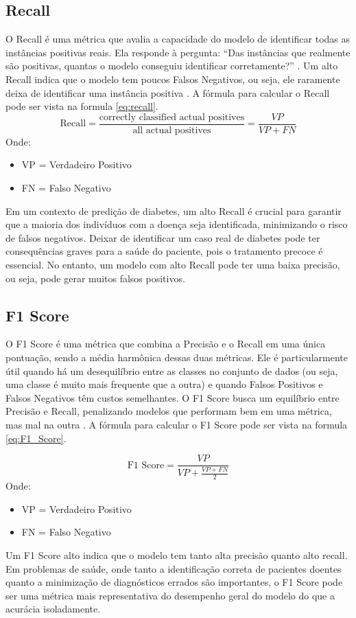 \subsection{Recall}
O Recall é uma métrica que avalia a capacidade do modelo de identificar todas as instâncias positivas reais. Ela responde à pergunta: “Das instâncias que realmente são positivas, quantas o modelo conseguiu identificar corretamente?” . Um alto Recall indica que o modelo tem poucos Falsos Negativos, ou seja, ele raramente deixa de identificar uma instância positiva \cite{Freitas2024}.
A fórmula para calcular o Recall pode ser vista na formula \ref{eq:recall}.
\begin{equation}
 \text{Recall} = \frac{\text{correctly classified actual positives}}{\text{all actual positives}} = \frac{VP}{VP+FN} 
    \label{eq:recall}
\end{equation}
Onde:
\begin{itemize}
    \item VP = Verdadeiro Positivo
    \item FN = Falso Negativo
\end{itemize}
Em um contexto de predição de diabetes, um alto Recall é crucial para garantir que a maioria dos indivíduos com a doença seja identificada, minimizando o risco de falsos negativos. Deixar de identificar um caso real de diabetes pode ter consequências graves para a saúde do paciente, pois o tratamento precoce é essencial. No entanto, um modelo com alto Recall pode ter uma baixa precisão, ou seja, pode gerar muitos falsos positivos.

\subsection{F1 Score}
O F1 Score é uma métrica que combina a Precisão e o Recall em uma única pontuação, sendo a média harmônica dessas duas métricas. Ele é particularmente útil quando há um desequilíbrio entre as classes no conjunto de dados (ou seja, uma classe é muito mais frequente que a outra) e quando Falsos Positivos e Falsos Negativos têm custos semelhantes. O F1 Score busca um equilíbrio entre Precisão e Recall, penalizando modelos que performam bem em uma métrica, mas mal na outra \cite{Han2012}.
A fórmula para calcular o F1 Score pode ser vista na formula \ref{eq:F1_Score}.

\begin{equation}
 \text{F1 Score} = \frac{VP}{VP + \frac{VP+FN}{2}} 
  \label{eq:F1_Score}
 \end{equation}
Onde:
\begin{itemize}
    \item VP = Verdadeiro Positivo
    \item FN = Falso Negativo
\end{itemize}
Um F1 Score alto indica que o modelo tem tanto alta precisão quanto alto recall. Em problemas de saúde, onde tanto a identificação correta de pacientes doentes quanto a minimização de diagnósticos errados são importantes, o F1 Score pode ser uma métrica mais representativa do desempenho geral do modelo do que a acurácia isoladamente.


